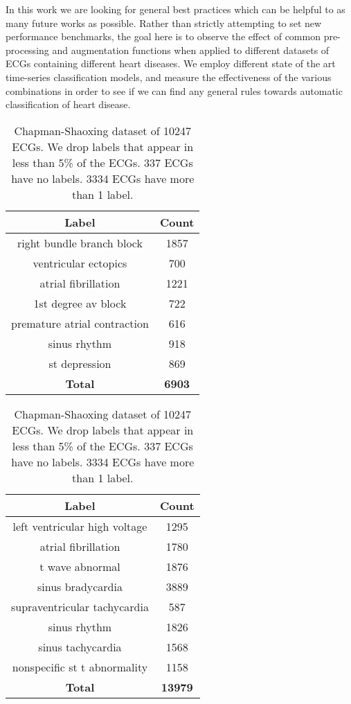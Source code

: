 \documentclass{article}
\begin{document}
In this work we are looking for general best practices which can be helpful to as many future works as possible. Rather than strictly attempting to set new performance benchmarks, the goal here is to observe the effect of common pre-processing and augmentation functions when applied to different datasets of ECGs containing different heart diseases. We employ different state of the art time-series classification models, and measure the effectiveness of the various combinations in order to see if we can find any general rules towards automatic classification of heart disease.

\begin{table}
\centering
\begin{tabular}{|c|c|}
 \hline
Label & Count \\
 \hline
right bundle branch block    &  1857 \\
ventricular ectopics         &   700 \\
atrial fibrillation          &  1221 \\
1st degree av block          &   722 \\
premature atrial contraction &   616 \\
sinus rhythm                 &   918 \\
st depression                &   869 \\
 \hline
\textbf{Total} & \textbf{6903}\\
\hline
\end{tabular}
\caption {CPSC2018 dataset of 6877 ECGs. 368 ECGs have no labels. 394 ECGs have more than 1 label.\\}
\label{CSPC}

\begin{tabular}{|c|c|}
 \hline
Label & Count \\
 \hline
left ventricular high voltage &  1295 \\
atrial fibrillation           &  1780 \\
t wave abnormal               &  1876 \\
sinus bradycardia             &  3889 \\
supraventricular tachycardia  &   587 \\
sinus rhythm                  &  1826 \\
sinus tachycardia             &  1568 \\
nonspecific st t abnormality  &  1158 \\
 \hline
\textbf{Total} & \textbf{13979}\\
\hline


\end{tabular}

\caption {Chapman-Shaoxing dataset of 10247 ECGs. We drop labels that appear in less than 5\% of the ECGs. 337 ECGs have no labels. 3334 ECGs have more than 1 label.}

\label{ChapmanShaoxing}

\end{table}
\end{document}
